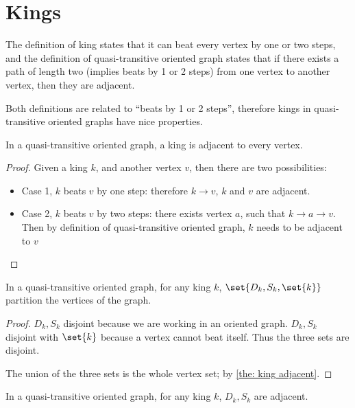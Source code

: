 \section{Kings}\label{sec: quasi-transitive king}

The definition of king states that it can beat every vertex
by one or two steps,
and the definition of quasi-transitive oriented graph states that
if there exists a path of length two (implies beats by 1 or 2 steps)
from one vertex to another vertex, then they are adjacent.

Both definitions are related to ``beats by 1 or 2 steps'',
therefore kings in quasi-transitive oriented graphs
have nice properties.

\begin{lemma}\label{the: king adjacent}
  In a quasi-transitive oriented graph,
  a king is adjacent to every vertex.
\end{lemma}

\begin{proof}
  Given a king \(k\), and another vertex \(v\),
  then there are two possibilities:
  \begin{itemize}
    \item
      Case 1, \(k\) beats \(v\) by one step:
      therefore \(k \to v\), \(k\) and \(v\) are adjacent.
    \item
      Case 2, \(k\) beats \(v\) by two steps:
      there exists vertex \(a\), such that \(k \to a \to v\).
      Then by definition of quasi-transitive oriented graph,
      \(k\) needs to be adjacent to \(v\)
  \end{itemize}
\end{proof}

\begin{lemma}\label{the: king partitions in quasi-transitive}
  In a quasi-transitive oriented graph,
  for any king \(k\), \(\set{D_k, S_k, \set{k}}\)
  partition the vertices of the graph.
\end{lemma}

\begin{proof}
  \(D_k, S_k\) disjoint because we are working in an oriented graph.
  \(D_k, S_k\) disjoint with \(\set{k}\)
  because a vertex cannot beat itself.
  Thus the three sets are disjoint.

  The union of the three sets is the whole vertex set;
  by \cref{the: king adjacent}.
\end{proof}

\begin{lemma}\label{the: D S of king adjacent in quasi-transitive}
  In a quasi-transitive oriented graph,
  for any king \(k\), \(D_k, S_k\) are adjacent.
\end{lemma}

